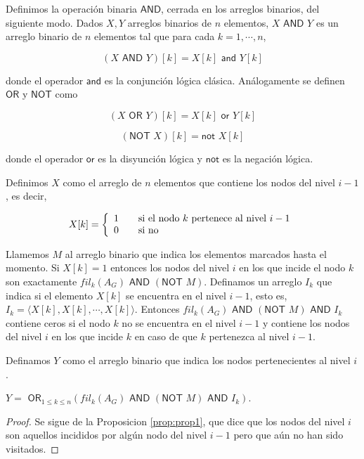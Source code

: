\begin{defi}
Definimos la operación binaria $\textsf{AND}$, cerrada en los arreglos binarios, del siguiente modo. Dados $X, Y$ arreglos binarios de $n$ elementos, $X \textsf{ AND } Y$ es un arreglo binario de $n$ elementos tal que para cada $k = 1, \cdots, n$,

\[(X\textsf{ AND }Y)[k] = X[k] \textsf{ and } Y[k] 
\]

donde el operador $\textsf{and}$ es la conjunción lógica clásica. Análogamente se definen $\textsf{OR}$ y $\textsf{NOT}$ como

\[(X\textsf{ OR }Y)[k] = X[k] \textsf{ or } Y[k] 
\]

\[(\textsf{NOT }X)[k] = \textsf{not } X[k] 
\]

donde el operador $\textsf{or}$ es la disyunción lógica y $\textsf{not}$ es la negación lógica.\\[0.25cm]
\end{defi}

Definimos $X$ como el arreglo de $n$ elementos que contiene los nodos del nivel $i - 1$, es decir,

\[X[k] = \left\{ 
  \begin{array}{l l}
    1 & \quad \text{si el nodo } k \text{ pertenece al nivel } i - 1\\
    0 & \quad \text{si no}
  \end{array} \right.
\]

Llamemos $M$ al arreglo binario que indica los elementos marcados hasta el momento. Si $X[k] = 1$ entonces los nodos del nivel $i$ en los que incide el nodo $k$ son exactamente $fil_k(A_G) \textsf{ AND } (\textsf{NOT }M)$. Definamos un arreglo $I_k$ que indica si el elemento $X[k]$ se encuentra en el nivel $i - 1$, esto es, $I_k = \langle X[k], X[k], \cdots, X[k] \rangle$. Entonces $fil_k(A_G) \textsf{ AND }(\textsf{NOT } M) \textsf{ AND } I_k$ contiene ceros si el nodo $k$ no se encuentra en el nivel $i - 1$ y contiene los nodos del nivel $i$ en los que incide $k$ en caso de que $k$ pertenezca al nivel $i - 1$.

Definamos $Y$ como el arreglo binario que indica los nodos pertenecientes al nivel $i$.

\begin{prop}
\label{prop:prop2}
$Y = \textsf{ OR}_{1 \leq k \leq n} (fil_k(A_G) \textsf{ AND } (\textsf{NOT }M) \textsf{ AND } I_k)$.

\begin{proof}
Se sigue de la Proposicion \ref{prop:prop1}, que dice que los nodos del nivel $i$ son aquellos incididos por algún nodo del nivel $i - 1$ pero que aún no han sido visitados.
\end{proof}
\end{prop}

